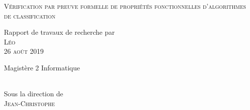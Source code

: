 \begin{titlepage}
	\begin{center}

		\newcommand\important{\huge \scshape }
		\newcommand\notimportant{\Large}
		\newcommand\vspa[1]{\vspace*{#1\textheight}}

		\important{} Vérification par preuve formelle de propriétés fonctionnelles d'algorithmes de classification

		\vspa{0.1}

		\notimportant{} Rapport de travaux de recherche par\\
		\important{} Léo \\
		\vspa{0.02}
		\notimportant{} 26 août 2019\\

		\vspa{0.1}

		\notimportant{} Magistère 2 Informatique\\
		\vspa{0.05}
		\\

		\vspa{0.1}

		\notimportant{} Sous la direction de\\
		\important{} Jean-Christophe~

	\end{center}
\end{titlepage}
